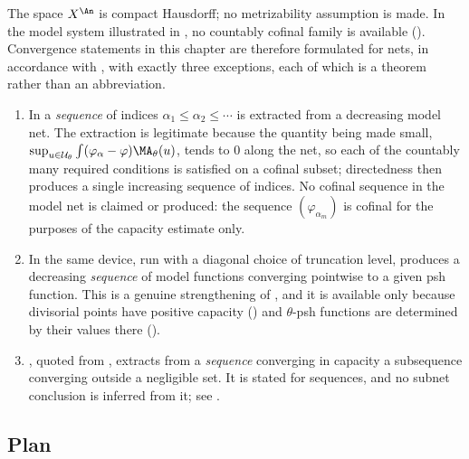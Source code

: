 The space $X^{\An}$ is compact Hausdorff; no metrizability assumption is
made.  In the model system illustrated in
, no countably cofinal family is available
().  Convergence statements in this chapter
are therefore formulated for nets, in accordance with
, with exactly three exceptions, each of
which is a theorem rather than an abbreviation.

\begin{enumerate}
\item\label{itm:ch25-seq:chebyshev}
 In  a \emph{sequence} of indices
 $\alpha_1\leq\alpha_2\leq\cdots$ is extracted from a decreasing model
 net.  The extraction is legitimate because the quantity being made small,
 $\sup_{u\in\mathcal U_\theta}\int(\varphi_\alpha-\varphi)\MA_\theta(u)$,
 tends to $0$ along the net, so each of the countably many required
 conditions is satisfied on a cofinal subset; directedness then produces a
 single increasing sequence of indices.  No cofinal sequence in the model
 net is claimed or produced: the sequence $(\varphi_{\alpha_m})$ is
 cofinal for the purposes of the capacity estimate only.
\item\label{itm:ch25-seq:diag}
 In  the same device, run with a
 diagonal choice of truncation level, produces a decreasing
 \emph{sequence} of model functions converging pointwise to a given psh
 function.  This is a genuine strengthening of
 , and it is available only because
 divisorial points have positive capacity
 () and $\theta$-psh functions are
 determined by their values there ().
\item\label{itm:ch25-seq:subseq}
 , quoted from
 , extracts from a \emph{sequence} converging
 in capacity a subsequence converging outside a negligible set.  It is
 stated for sequences, and no subnet conclusion is inferred from it; see
 .
\end{enumerate}

\subsection{Plan}
\label{sec:ch25-plan}

